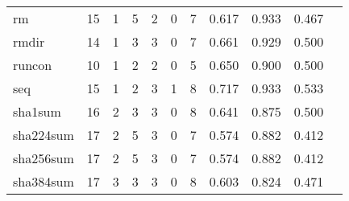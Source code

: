 \begin{longtable}{lp{1.10cm}p{1.10cm}p{1.10cm}p{1.10cm}p{1.10cm}p{1.10cm}p{1.10cm}p{1.10cm}p{1.10cm}p{1.10cm}}
rm        &                     15 &                                  1 &                                 5 &                                2 &                                 0 &                               7 &                          0.617 &                                 0.933 &                               0.467 \\
rmdir     &                     14 &                                  1 &                                 3 &                                3 &                                 0 &                               7 &                          0.661 &                                 0.929 &                               0.500 \\
runcon    &                     10 &                                  1 &                                 2 &                                2 &                                 0 &                               5 &                          0.650 &                                 0.900 &                               0.500 \\
seq       &                     15 &                                  1 &                                 2 &                                3 &                                 1 &                               8 &                          0.717 &                                 0.933 &                               0.533 \\
sha1sum   &                     16 &                                  2 &                                 3 &                                3 &                                 0 &                               8 &                          0.641 &                                 0.875 &                               0.500 \\
sha224sum &                     17 &                                  2 &                                 5 &                                3 &                                 0 &                               7 &                          0.574 &                                 0.882 &                               0.412 \\
sha256sum &                     17 &                                  2 &                                 5 &                                3 &                                 0 &                               7 &                          0.574 &                                 0.882 &                               0.412 \\
sha384sum &                     17 &                                  3 &                                 3 &                                3 &                                 0 &                               8 &                          0.603 &                                 0.824 &                               0.471 \\

\end{longtable}
